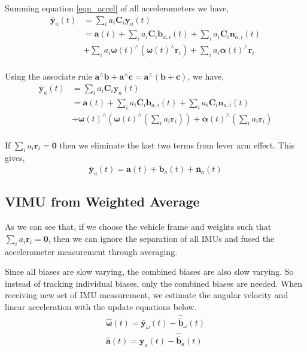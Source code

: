 \documentclass[conference]{IEEEtran}
\begin{document}
Summing equation \ref{eqn_accel} of all accelerometers we have,
\begin{equation}
\begin{split}
    \bar{\textbf{y}}_a(t) &= \sum_i{a_i \textbf{C}_{i} \textbf{y}_a(t)} \\
    &= \textbf{a}(t) + \sum_i{a_i \textbf{C}_{i} \textbf{b}_{a,i}(t)} + \sum_i{a_i \textbf{C}_{i} \textbf{n}_{a,i}(t)} \\
    &+ \sum_i{a_i \bm{\omega}(t)^\wedge (\bm{\omega}(t)^\wedge \textbf{r}_i)} + \sum_i{a_i \bm{\alpha}(t)^\wedge \textbf{r}_i} \\
\end{split}
\end{equation}

Using the associate rule $\textbf{a}^\wedge \textbf{b} + \textbf{a}^\wedge \textbf{c} = \textbf{a}^\wedge \left(\textbf{b} + \textbf{c}\right)$, we have,
\begin{equation}
\begin{split}
    \bar{\textbf{y}}_a(t) &= \sum_i{a_i \textbf{C}_{i} \textbf{y}_a(t)} \\
    &= \textbf{a}(t) + \sum_i{a_i \textbf{C}_{i} \textbf{b}_{a,i}(t)} + \sum_i{a_i \textbf{C}_{i} \textbf{n}_{a,i}(t)} \\
    &+ \bm{\omega}(t)^\wedge \left(\bm{\omega}(t)^\wedge \left( \sum_i{a_i \textbf{r}_i} \right) \right) + \bm{\alpha}(t)^\wedge \left( \sum_i{a_i\textbf{r}_i} \right)\\
\end{split}
\end{equation}

If $\sum_i{a_i \textbf{r}_i} = \textbf{0}$ then we eliminate the last two terms from lever arm effect. This gives,
\begin{equation}
    \bar{\textbf{y}}_a(t) = \textbf{a}(t) + \bar{\textbf{b}}_a(t) + \bar{\textbf{n}}_a(t)
\end{equation}

\subsection{VIMU from Weighted Average}\label{AA}

As we can see that, if we choose the vehicle frame and weights such that $\sum_i{a_i \textbf{r}_i} = \textbf{0}$, then we can ignore the separation of all IMUs and fused the accelerometer measurement through averaging.

Since all biases are slow varying, the combined biases are also slow varying. So instead of tracking individual biases, only the combined biases are needed. When receiving new set of IMU measurement, we estimate the angular velocity and linear acceleration with the update equations below.
\begin{equation}
\begin{split}
    \hat{\bm{\omega}}(t) = \bar{\textbf{y}}_\omega(t) - \hat{\bar{\textbf{b}}}_\omega(t) \\
    \hat{\textbf{a}}(t)  = \bar{\textbf{y}}_a(t) - \hat{\bar{\textbf{b}}}_a(t)
\end{split}
\end{equation}
\end{document}
